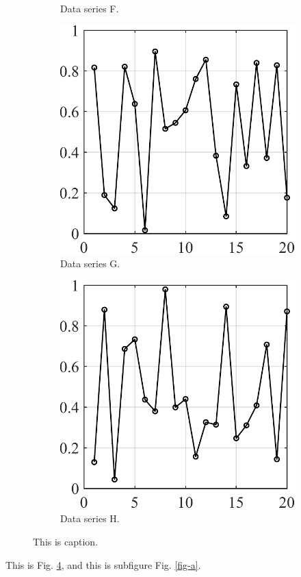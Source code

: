 \documentclass[a4paper]{article}
\begin{document}
\begin{figure}[h!]
\begin{subfigure}[b]{\CE\textwidth}
    \caption{Data series F.}
    \label{fig-f}
\end{subfigure}
\hfill
\begin{subfigure}[b]{\CE\textwidth}
    \includegraphics[width=\textwidth]{pic-7.pdf}
    \caption{Data series G.}
    \label{fig-G}
\end{subfigure}
\hfill
\begin{subfigure}[b]{\CE\textwidth}
    \includegraphics[width=\textwidth]{pic-8.pdf}
    \caption{Data series H.}
    \label{fig-H}
\end{subfigure}
\caption{This is caption.}
\label{fig}
\end{figure}

This is Fig. \ref{fig}, and this is subfigure Fig. \ref{fig-a}.
\end{document}
